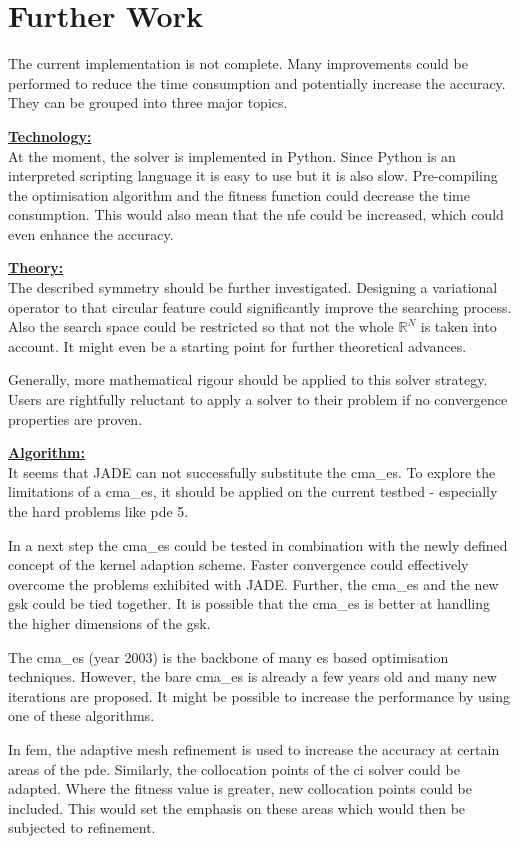 \documentclass[./\jobname.tex]{subfiles}
\begin{document}
\chapter{Further Work}

The current implementation is not complete. Many improvements could be performed to reduce the time consumption and potentially increase the accuracy. They can be grouped into three major topics.  

\underline{\textbf{Technology:}} \\
At the moment, the solver is implemented in Python. Since Python is an interpreted scripting language it is easy to use but it is also slow. Pre-compiling the optimisation algorithm and the fitness function could decrease the time consumption. This would also mean that the \gls{nfe} could be increased, which could even enhance the accuracy.

\underline{\textbf{Theory:}}\\
The described symmetry should be further investigated. Designing a variational operator to that circular feature could significantly improve the searching process. Also the search space could be restricted so that not the whole $\mathbb{R}^N$ is taken into account. It might even be a starting point for further theoretical advances.

Generally, more mathematical rigour should be applied to this solver strategy. Users are rightfully reluctant to apply a solver to their problem if no convergence properties are proven. 

\underline{\textbf{Algorithm:}}\\
It seems that JADE can not successfully substitute the \gls{cma_es}. To explore the limitations of a \gls{cma_es}, it should be applied on the current testbed - especially the hard problems like \gls{pde} 5. 

In a next step the \gls{cma_es} could be tested in combination with the newly defined concept of the kernel adaption scheme. Faster convergence could effectively overcome the problems exhibited with JADE. Further, the \gls{cma_es} and the new \gls{gsk} could be tied together. It is possible that the \gls{cma_es} is better at handling the higher dimensions of the \gls{gsk}. 

The \gls{cma_es} (year 2003) is the backbone of many \gls{es} based optimisation techniques. However, the bare \gls{cma_es} is already a few years old and many new iterations are proposed. It might be possible to increase the performance by using one of these algorithms. 

In \gls{fem}, the adaptive mesh refinement is used to increase the accuracy at certain areas of the \gls{pde}. Similarly, the collocation points of the \gls{ci} solver could be adapted. Where the fitness value is greater, new collocation points could be included. This would set the emphasis on these areas which would then be subjected to refinement. 
\end{document}
